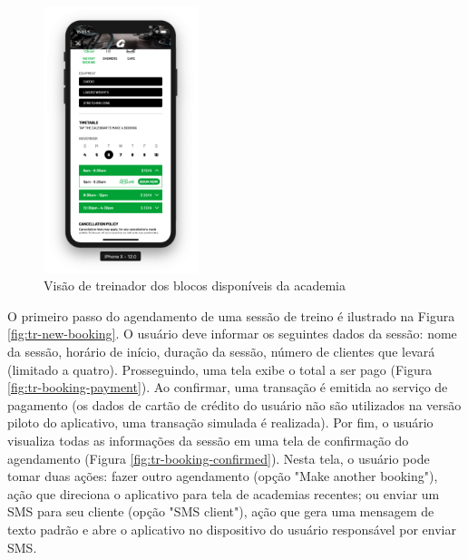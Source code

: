 \begin{figure}[H]
    \centering
    \includegraphics[width=0.4\textwidth]{pfc/figuras/tr-gym-profile-2.png}
    \caption{Visão de treinador dos blocos disponíveis da academia}
    \label{fig:tr-gym-profile-timetable}
\end{figure}

O primeiro passo do agendamento de uma sessão de treino é ilustrado na Figura \ref{fig:tr-new-booking}. O usuário deve informar os seguintes dados da sessão: nome da sessão, horário de início, duração da sessão, número de clientes que levará (limitado a quatro). Prosseguindo, uma tela exibe o total a ser pago (Figura \ref{fig:tr-booking-payment}). Ao confirmar, uma transação é emitida ao serviço de pagamento (os dados de cartão de crédito do usuário não são utilizados na versão piloto do aplicativo, uma transação simulada é realizada). Por fim, o usuário visualiza todas as informações da sessão em uma tela de confirmação do agendamento (Figura \ref{fig:tr-booking-confirmed}). Nesta tela, o usuário pode tomar duas ações: fazer outro agendamento (opção "Make another booking"), ação que direciona o aplicativo para tela de academias recentes; ou enviar um SMS para seu cliente (opção "SMS client"), ação que gera uma mensagem de texto padrão e abre o aplicativo no dispositivo do usuário responsável por enviar SMS.

